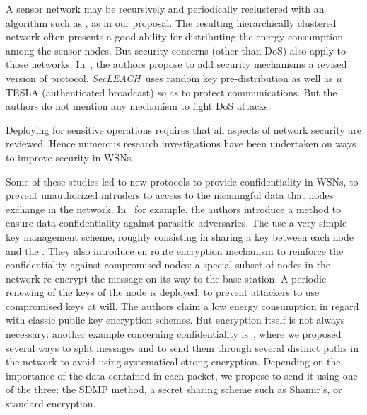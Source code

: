 
A sensor network may be recursively and periodically reclustered with an algorithm such as \leach, as in our proposal.
The resulting hierarchically clustered network often presents a good ability for distributing the energy consumption among the sensor nodes.
But security concerns (other than DoS) also apply to those networks.
In~\cite{OFVWBDL07}, the authors propose to add security mechanisms \via a revised version of \leach protocol.
\textit{SecLEACH}\ uses random key pre-distribution as well as $\mu$TESLA (authenticated broadcast) so as to protect communications.
But the authors do not mention any mechanism to fight DoS attacks.



Deploying \wsns for sensitive operations requires that all aspects of network security are reviewed.
Hence numerous research investigations have been undertaken on ways to improve security in WSNs.

Some of these studies led to new protocols to provide confidentiality in WSNs, \ie to prevent unauthorized intruders to access to the meaningful data that nodes exchange in the network.
In~\cite{LPH08} for example, the authors introduce a method to ensure data confidentiality against parasitic adversaries.
The use a very simple key management scheme, roughly consisting in sharing a key between each node and the \bs.
They also introduce en route encryption mechanism to reinforce the confidentiality against compromised nodes: a special subset of nodes in the network re-encrypt the message on its way to the base station.
A periodic renewing of the keys of the node is deployed, to prevent attackers to use compromised keys at will.
The authors claim a low energy consumption in regard with classic public key encryption schemes.
But encryption itself is not always necessary: another example concerning confidentiality is~\cite{MMB13}, where we proposed several ways to split messages and to send them through several distinct paths in the network to avoid using systematical strong encryption.
Depending on the importance of the data contained in each packet, we propose to send it using one of the three: the SDMP method\cite{BM10}, a secret sharing scheme such as Shamir's\cite{Sha79}, or standard encryption.

